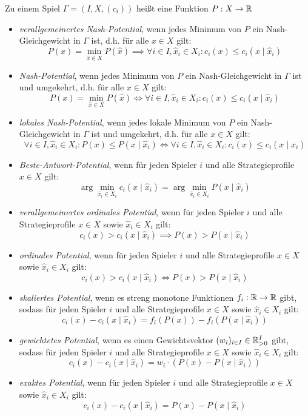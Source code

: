 \begin{defn}
	Zu einem Spiel $\Gamma = (I, X, (c_i))$ heißt eine Funktion $P: X \to \mathbb{R}$
	\begin{itemize}
		\item \emph{verallgemeinertes Nash-Potential}, wenn jedes Minimum von $P$ ein Nash-Gleich\-ge\-wicht in $\Gamma$ ist, d.h. für alle $x \in X$ gilt:
			\[P(x) = \min_{\hat{x} \in X}P(\hat{x}) \implies \forall i \in I, \hat{x}_i \in X_i: c_i(x) \leq c_i(x \mid \hat{x}_i) \]
		\item \emph{Nash-Potential}, wenn jedes Minimum von $P$ ein Nash-Gleichgewicht in $\Gamma$ ist und umgekehrt, d.h. für alle $x \in X$ gilt:
			\[P(x) = \min_{\hat{x} \in X}P(\hat{x}) \iff \forall i \in I, \hat{x}_i \in X_i: c_i(x) \leq c_i(x \mid \hat{x}_i) \]
		\item \emph{lokales Nash-Potential}, wenn jedes \glqq lokale\grqq{} Minimum von $P$ ein Nash-Gleichgewicht in $\Gamma$ ist und umgekehrt, d.h. für alle $x \in X$ gilt:
			\[\forall i \in I, \hat{x}_i \in X_i: P(x) \leq P(x \mid \hat{x}_i) \iff \forall i \in I, \hat{x}_i \in X_i: c_i(x) \leq c_i(x \mid \hat{x}_i) \]
		\item \emph{Beste-Antwort-Potential}, wenn für jeden Spieler $i$ und alle Strategieprofile $x \in X$ gilt:
			\[\arg\min_{\hat{x}_i \in X_i}c_i(x \mid \hat{x}_i) = \arg \min_{\hat{x}_i \in X_i} P(x \mid \hat{x}_i)\]
		\item \emph{verallgemeinertes ordinales Potential}, wenn für jeden Spieler $i$ und alle Strategieprofile $x \in X$ sowie $\hat{x}_i \in X_i$ gilt:
			\[c_i(x) > c_i(x \mid \hat{x}_i) \implies P(x) > P(x \mid \hat{x}_i)\]
		\item \emph{ordinales Potential}, wenn für jeden Spieler $i$ und alle Strategieprofile $x \in X$ sowie $\hat{x}_i \in X_i$ gilt:
			\[c_i(x) > c_i(x \mid \hat{x}_i) \iff P(x) > P(x \mid \hat{x}_i)\]
		\item \emph{skaliertes Potential}, wenn es streng monotone Funktionen $f_i: \mathbb{R} \to \mathbb{R}$ gibt, sodass für jeden Spieler $i$ und alle Strategieprofile $x \in X$ sowie $\hat{x}_i \in X_i$ gilt:
			\[c_i(x) - c_i(x \mid \hat{x}_i) = f_i(P(x)) - f_i(P(x \mid \hat{x}_i))\]
		\item \emph{gewichtetes Potential}, wenn es einen Gewichtsvektor $(w_i)_{i\in I} \in \mathbb{R}_{>0}^I$ gibt, sodass für jeden Spieler $i$ und alle Strategieprofile $x \in X$ sowie $\hat{x}_i \in X_i$ gilt:
			\[c_i(x) - c_i(x \mid \hat{x}_i) = w_i\cdot(P(x) - P(x \mid \hat{x}_i))\]
		\item \emph{exaktes Potential}, wenn für jeden Spieler $i$ und alle Strategieprofile $x \in X$ sowie $\hat{x}_i \in X_i$ gilt:
			\[c_i(x) - c_i(x \mid \hat{x}_i) = P(x) - P(x \mid \hat{x}_i)\]
	\end{itemize}
\end{defn}

